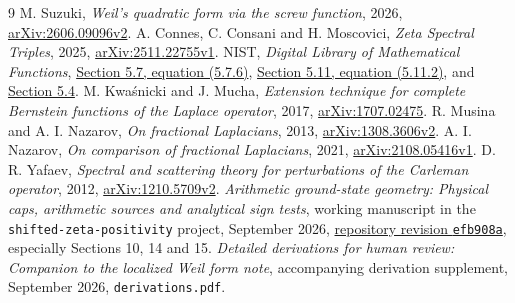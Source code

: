 \begin{thebibliography}{9}
 M. Suzuki, \emph{Weil's quadratic form via the screw function},
2026, \href{https://arxiv.org/abs/2606.09096v2}{arXiv:2606.09096v2}.
 A. Connes, C. Consani and H. Moscovici,
\emph{Zeta Spectral Triples}, 2025,
\href{https://arxiv.org/abs/2511.22755v1}{arXiv:2511.22755v1}.
 NIST, \emph{Digital Library of Mathematical Functions},
\href{https://dlmf.nist.gov/5.7.E6}{Section 5.7, equation (5.7.6)},
\href{https://dlmf.nist.gov/5.11.E2}{Section 5.11, equation (5.11.2)}, and
\href{https://dlmf.nist.gov/5.4}{Section 5.4}.
 M. Kwa\'snicki and J. Mucha, \emph{Extension technique for complete
Bernstein functions of the Laplace operator}, 2017,
\href{https://arxiv.org/abs/1707.02475}{arXiv:1707.02475}.
 R. Musina and A. I. Nazarov, \emph{On fractional Laplacians},
2013, \href{https://arxiv.org/abs/1308.3606v2}{arXiv:1308.3606v2}.
 A. I. Nazarov, \emph{On comparison of fractional Laplacians},
2021, \href{https://arxiv.org/abs/2108.05416v1}{arXiv:2108.05416v1}.
 D. R. Yafaev, \emph{Spectral and scattering theory for perturbations
of the Carleman operator}, 2012,
\href{https://arxiv.org/abs/1210.5709v2}{arXiv:1210.5709v2}.
 \emph{Arithmetic ground-state geometry: Physical caps,
arithmetic sources and analytical sign tests}, working manuscript in the
\texttt{shifted-zeta-positivity} project, September 2026,
\href{https://github.com/ebbaker/shifted-zeta-positivity/tree/efb908ab32245eba55c0c751f3b4a33b7306e6b7/papers/susy-positivity/investigations/arithmetic-ground-state-geometry}{repository revision \texttt{efb908a}}, especially Sections 10, 14 and 15.
\ifdefined\MainManuscript
{} \emph{Detailed derivations for human review:
Companion to the localized Weil form note}, accompanying derivation
supplement, September 2026, \texttt{derivations.pdf}.
\fi
\end{thebibliography}
